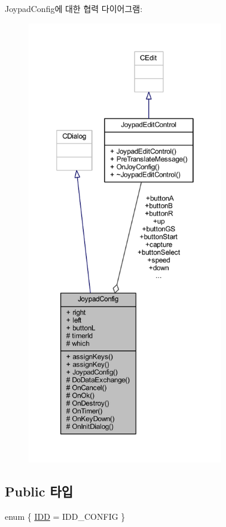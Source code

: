 Joypad\+Config에 대한 협력 다이어그램\+:\nopagebreak
\begin{figure}[H]
\begin{center}
\leavevmode
\includegraphics[height=550pt]{class_joypad_config__coll__graph}
\end{center}
\end{figure}
\subsection*{Public 타입}
\begin{DoxyCompactItemize}
\item 
enum \{ \mbox{\hyperlink{class_joypad_config_a3de60b70a9e5b5a104211e300d388beaa3576d2df47b78d2eb08aaf607547efaf}{I\+DD}} = I\+D\+D\+\_\+\+C\+O\+N\+F\+IG
 \}
\end{DoxyCompactItemize}
